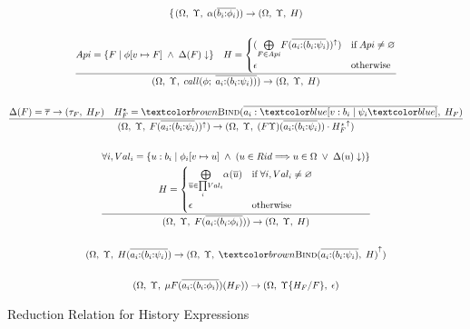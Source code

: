 \begin{figure}[H]
\begin{equation*}
\begin{gathered}
{\begin{gathered}
\begin{cases}
                    \end{cases}
                \end{gathered}
            }{
                (\Omega, \;\Upsilon, \;\alpha(\overline{b_i{:}\phi_i})) \rightarrow (\Omega, \;\Upsilon, \;H)
            } \\ \\
            \frac{
                Api = \{ F \;|\; \phi[v \mapsto F] \;\land\; \Delta(F)\downarrow \} \quad H = \begin{cases}
                    (\underset{F \in Api}{\bigoplus} F(\overline{a_i{:}(b_i{:}\psi_i}))^{\uparrow}) & \text{if}\;Api \neq \varnothing \\
                    \epsilon & \text{otherwise}
                \end{cases}
            }{
                (\Omega, \;\Upsilon, \;call(\phi; \;\overline{a_i{:}(b_i{:}\psi_i))}) \rightarrow (\Omega, \;\Upsilon, \;H)
            } \\ \\
            \frac{
                \Delta(F) = \overline{\tau} \rightarrow (\tau_F, \; H_F) \quad H_F^{\star} = \bind(\overline{a_i: \under{v: b_i \;|\; \psi_i}}, \;H_F)
            }{
                (\Omega, \;\Upsilon, \;F(\overline{a_i{:}(b_i{:}\psi_i}))^{\uparrow}) \rightarrow (\Omega, \;\Upsilon, \;(F\Upsilon)(\overline{a_i{:}(b_i{:}\psi_i})) \cdot {H_F^{\star}}^{\uparrow})
            } \\ \\
            \frac{
                \begin{gathered}
                    \forall i, Val_i = \{u: b_i \;|\; \phi_i[v \mapsto u] \;\land\; (u \in Rid \Longrightarrow u \in \Omega \;\lor\; \Delta(u)\downarrow)\} \\
                    H = \begin{cases}
                        \underset{\overline{u} \in \underset{i}{\prod} Val_i}{\bigoplus} \alpha(\overline{u}) & \text{if}\;\forall i, Val_i \neq \varnothing \\
                        \epsilon & \text{otherwise}
                    \end{cases}             
                \end{gathered}
            }{
                (\Omega, \;\Upsilon, \;F(\overline{a_i{:}(b_i{:}\phi_i)})) \rightarrow (\Omega, \;\Upsilon, \;H)
            } \\ \\
            (\Omega, \;\Upsilon, \;H(\overline{a_i{:}(b_i{:}\psi_i)}) \rightarrow (\Omega, \;\Upsilon, \;{\bind(\overline{a_i{:}(b_i{:}\psi_i)}, \;H)}^{\uparrow}) \\ \\
            (\Omega, \;\Upsilon, \;\mu F(\overline{a_i{:}({b_i{:}\phi_i})})(H_F)) \rightarrow (\Omega, \;\Upsilon\{H_F/F\}, \;\epsilon)
        \end{gathered}
    \end{equation*}
    \caption{Reduction Relation for History Expressions}
    \label{fig:denot_history}
\end{figure}

